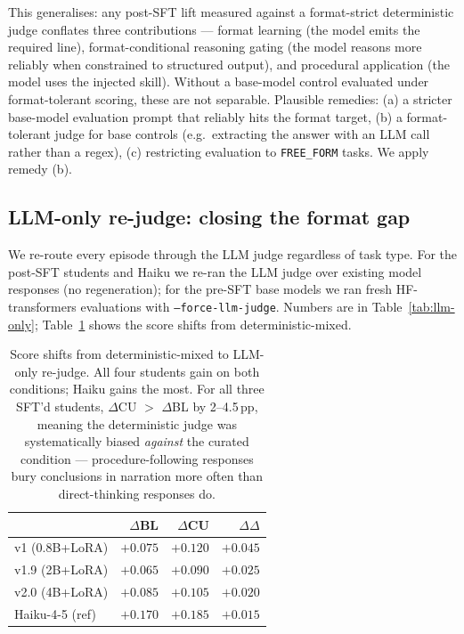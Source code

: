 \documentclass[10pt]{article}
\begin{document}
This generalises: any post-SFT lift measured against a format-strict deterministic judge conflates three contributions --- format learning (the model emits the required line), format-conditional reasoning gating (the model reasons more reliably when constrained to structured output), and procedural application (the model uses the injected skill). Without a base-model control evaluated under format-tolerant scoring, these are not separable. Plausible remedies: (a) a stricter base-model evaluation prompt that reliably hits the format target, (b) a format-tolerant judge for base controls (e.g.\ extracting the answer with an LLM call rather than a regex), (c) restricting evaluation to \texttt{FREE\_FORM} tasks. We apply remedy (b).

\subsection{LLM-only re-judge: closing the format gap}\label{sec:llm-rejudge}
We re-route every episode through the LLM judge regardless of task type. For the post-SFT students and Haiku we re-ran the LLM judge over existing model responses (no regeneration); for the pre-SFT base models we ran fresh HF-transformers evaluations with \texttt{--force-llm-judge}. Numbers are in Table~\ref{tab:llm-only}; Table~\ref{tab:rejudge-deltas} shows the score shifts from deterministic-mixed.

\begin{table}[h]
\centering
\small
\begin{tabular}{@{}l r r r@{}}
\toprule
& $\Delta$BL & $\Delta$CU & $\Delta\Delta$ \\
\midrule
v1   (0.8B+LoRA)   & $+0.075$ & $+0.120$ & $+0.045$ \\
v1.9 (2B+LoRA)     & $+0.065$ & $+0.090$ & $+0.025$ \\
v2.0 (4B+LoRA)     & $+0.085$ & $+0.105$ & $+0.020$ \\
Haiku-4-5 (ref)    & $+0.170$ & $+0.185$ & $+0.015$ \\
\bottomrule
\end{tabular}
\caption{Score shifts from deterministic-mixed to LLM-only re-judge. All four students gain on both conditions; Haiku gains the most. For all three SFT'd students, $\Delta$CU $>$ $\Delta$BL by 2--4.5\,pp, meaning the deterministic judge was systematically biased \emph{against} the curated condition --- procedure-following responses bury conclusions in narration more often than direct-thinking responses do.}
\label{tab:rejudge-deltas}
\end{table}
\end{document}

